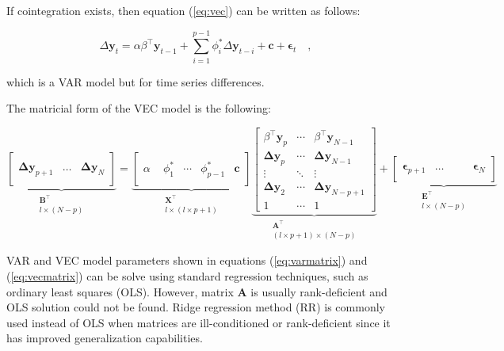 If cointegration exists, then equation (\ref{eq:vec}) can be written as follows:


\begin{equation}
 \label{eq:vecfull}
 \Delta \mathbf{y}_t = \alpha \beta^\top\mathbf{y}_{t-1} 
 + \sum_{i=1}^{p-1} \phi_i^*\Delta
\mathbf{y}_{t-i}  + \mathbf{c} + \mathbf{\epsilon}_t \quad ,
\end{equation}

\noindent which is a VAR model but for time series differences.

The matricial form of the VEC model is the following:

\begin{equation} \label{eq:vecmatrix}
\underbrace{
               \begin{bmatrix}
               \quad\\
                \mathbf{\Delta y}_{p+1} & 
                \dots &
                \mathbf{\Delta y}_N \\
                \quad
               \end{bmatrix}
               }_{\substack{\mathbf{B}^\top\\ l \times (N-p) }} =
   \underbrace{
    \begin{bmatrix}
     \quad \\
     \alpha & \phi_1^* & \cdots & \phi_{p-1}^* & \mathbf{c} \\  
     \quad
     \end{bmatrix} 
     }_{\substack{ \mathbf{X}^\top\\ l \times (l\times p +1)}}
\underbrace{\begin{bmatrix} 
   \beta^\top \mathbf{y}_{p} & 
   \cdots & \beta^\top \mathbf{y}_{N-1} \\
   \mathbf{\Delta y}_p  & \cdots 
   & \mathbf{\Delta y}_{N-1} \\ 
   \vdots  & \ddots & \vdots \\
   \mathbf{\Delta y}_2  & \cdots 
   & \mathbf{\Delta y}_{N-p+1} \\
   1 & \cdots & 1 
   \end{bmatrix}}_{\substack{\mathbf{A}^\top \\ (l \times p +1) \times (N-p) }}
+
\underbrace{\begin{bmatrix}
              \quad \\
              \mathbf{\epsilon}_{p+1} &
              \dots &
              \quad &\mathbf{\epsilon}_N \\ \quad
             \end{bmatrix}}_{\substack{\mathbf{E}^\top\\ l \times (N-p) }} 
\end{equation}

VAR and VEC model parameters shown in equations (\ref{eq:varmatrix}) and
(\ref{eq:vecmatrix}) can be solve using standard regression techniques, such as
ordinary least squares (OLS). However, matrix $\mathbf{A}$ is usually
rank-deficient and OLS solution could not be found. Ridge regression method (RR)
is commonly used instead of OLS when matrices are ill-conditioned or
rank-deficient since it has improved generalization capabilities.

